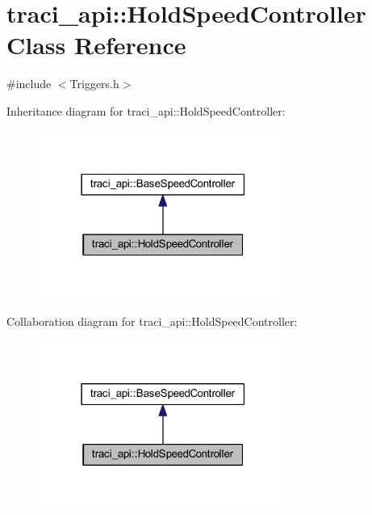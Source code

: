 \hypertarget{classtraci__api_1_1_hold_speed_controller}{}\section{traci\+\_\+api\+:\+:Hold\+Speed\+Controller Class Reference}
\label{classtraci__api_1_1_hold_speed_controller}


{\ttfamily \#include $<$Triggers.\+h$>$}



Inheritance diagram for traci\+\_\+api\+:\+:Hold\+Speed\+Controller\+:
\nopagebreak
\begin{figure}[H]
\begin{center}
\leavevmode
\includegraphics[width=231pt]{classtraci__api_1_1_hold_speed_controller__inherit__graph}
\end{center}
\end{figure}


Collaboration diagram for traci\+\_\+api\+:\+:Hold\+Speed\+Controller\+:
\nopagebreak
\begin{figure}[H]
\begin{center}
\leavevmode
\includegraphics[width=231pt]{classtraci__api_1_1_hold_speed_controller__coll__graph}
\end{center}
\end{figure}
